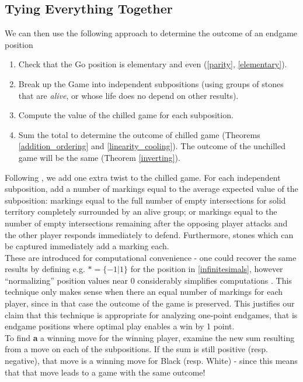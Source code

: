 \documentclass[../math194_paper.tex]{subfiles}
\begin{document}
\subsection{Tying Everything Together}

We can then use the following approach to determine the outcome of an endgame position
\begin{enumerate}
    \item Check that the Go position is elementary and even (\ref{parity}, \ref{elementary}).
    \item Break up the Game into independent subpositions 
    (using groups of stones that are \textit{alive}, or whose life 
    does no depend on other results).
    \item Compute the value of the chilled game for each subposition.
    \item Sum the total to determine the outcome of chilled game (Theorems \ref{addition_ordering} and \ref{linearity_cooling}).
    The outcome of the unchilled game will be the same (Theorem \ref{inverting}).
\end{enumerate}
Following \cite{berlekamp1994mathematical}, we add one extra twist to the chilled game.
For each independent subposition, add a number of markings equal to the average expected value of 
the subposition: markings equal to the full number of empty intersections for solid territory completely surrounded 
by an alive group; or markings equal to the number of empty intersections remaining after the opposing player 
attacks and the other player responds immediately to defend. 
Furthermore, stones which can be captured immediately add a marking each. \\
These are introduced for computational convenience - one could recover the same results 
by defining e.g. $* = \{-1 | 1\}$ for the position in \ref{infinitesimals}, however ``normalizing'' position values
near 0 considerably simplifies computations \cite[\S 4.1]{berlekamp1994mathematical}. 
This technique only makes sense when there an 
equal number of markings for each player, since in that case the outcome of the game is preserved.
This justifies our claim that this technique is appropriate for analyzing one-point endgames, that is endgame positions where optimal play enables a win by 1 point. \\

To find \textbf{a} a winning move for the winning player, examine 
the new sum resulting from a move on each of the subpositions. If the sum is 
still positive (resp. negative), that move is a winning move for Black 
(resp. White) - since this means that that move leads to a game with the same outcome!
\end{document}
